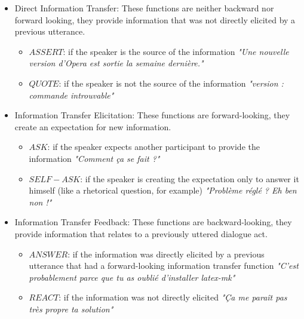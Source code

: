 \begin{itemize}
	\item Direct Information Transfer:
		\newline These functions are neither backward nor forward looking, they provide information that was not directly elicited by a previous utterance.
		\begin{itemize}
			\item $ASSERT$: if the speaker is the source of the information
			\newline \textit{"Une nouvelle version d'Opera est sortie la semaine dernière."}
			\item $QUOTE$: if the speaker is not the source of the information
			\newline \textit{"version : commande introuvable"}
		\end{itemize}
	\item Information Transfer Elicitation:
		\newline These functions are forward-looking, they create an expectation for new information.
		\begin{itemize}
			\item $ASK$: if the speaker expects another participant to provide the information
			\newline \textit{"Comment ça se fait ?"}
			\item $SELF-ASK$: if the speaker is creating the expectation only to answer it himself (like a rhetorical question, for example)
			\newline \textit{"Problème réglé ? Eh ben non !"}
		\end{itemize}
	\item Information Transfer Feedback:
		\newline These functions are backward-looking, they provide information that relates to a previously uttered dialogue act.
		\begin{itemize}
			\item $ANSWER$: if the information was directly elicited by a previous utterance that had a forward-looking information transfer function
			\newline \textit{"C'est probablement parce que tu as oublié d'installer latex-mk"}
			\item $REACT$: if the information was not directly elicited
			\newline \textit{"Ça me paraît pas très propre ta solution"}
		\end{itemize}
\end{itemize}

